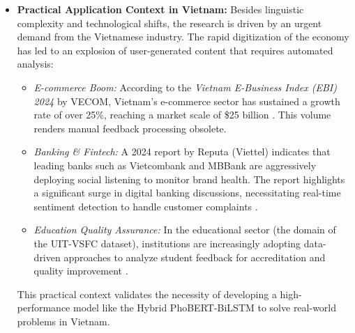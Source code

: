\documentclass[12pt]{report} %
\begin{document}
\begin{itemize}
\begin{itemize}
              \item \textbf{Transformer Era:} More recently, the emergence of \textbf{PhoBERT} \cite{nguyen2020phobertpretrainedlanguagemodels} --- the first large-scale pre-trained language model specifically designed for Vietnamese, built upon the BERT (Bidirectional Encoder Representations from Transformers) architecture --- has marked a breakthrough in Vietnamese NLP. Pre-trained on large-scale Vietnamese corpora, PhoBERT enables deep bidirectional contextual understanding and has achieved State-of-the-Art (SOTA) performance across numerous Vietnamese NLP tasks, including sentiment analysis, named entity recognition (NER), and text classification.

              \item \textbf{Hybrid Approach:} To leverage the complementary strengths of both architectures, recent studies have proposed the \textbf{Hybrid PhoBERT-BiLSTM} model, which integrates PhoBERT's deep semantic representation capability with the sequential bidirectional learning mechanism of BiLSTM. This hybrid architecture has demonstrated promising improvements in sentiment analysis performance on domain-specific Vietnamese datasets, including social media content and product reviews \cite{dang2023hybrid}.
          \end{itemize}

    \item \textbf{Practical Application Context in Vietnam:}
          Besides linguistic complexity and technological shifts, the research is driven by an urgent demand from the Vietnamese industry. The rapid digitization of the economy has led to an explosion of user-generated content that requires automated analysis:
          \begin{itemize}
              \item \textit{E-commerce Boom:} According to the \textit{Vietnam E-Business Index (EBI) 2024} by VECOM, Vietnam's e-commerce sector has sustained a growth rate of over 25\%, reaching a market scale of \$25 billion \cite{vecom_2024}. This volume renders manual feedback processing obsolete.
              \item \textit{Banking \& Fintech:} A 2024 report by Reputa (Viettel) indicates that leading banks such as Vietcombank and MBBank are aggressively deploying social listening to monitor brand health. The report highlights a significant surge in digital banking discussions, necessitating real-time sentiment detection to handle customer complaints \cite{reputa_2024}.
              \item \textit{Education Quality Assurance:} In the educational sector (the domain of the UIT-VSFC dataset), institutions are increasingly adopting data-driven approaches to analyze student feedback for accreditation and quality improvement \cite{younet_2023}.
          \end{itemize}
          This practical context validates the necessity of developing a high-performance model like the Hybrid PhoBERT-BiLSTM to solve real-world problems in Vietnam.
\end{itemize}
\end{document}
